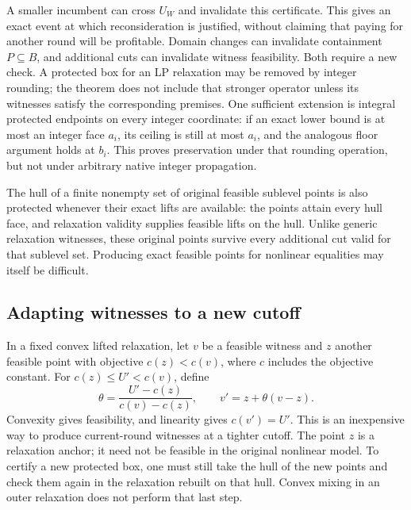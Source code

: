 A smaller incumbent can cross $U_W$ and invalidate this certificate.
This gives an exact event at which reconsideration is justified, without
claiming that paying for another round will be profitable. Domain changes
can invalidate containment $P\subseteq B$, and additional cuts can
invalidate witness feasibility. Both require a new check. A protected
box for an LP relaxation may be removed by integer rounding; the theorem
does not include that stronger operator unless its witnesses satisfy the
corresponding premises.
One sufficient extension is integral protected endpoints on every integer
coordinate: if an exact lower bound is at most an integer face $a_i$,
its ceiling is still at most $a_i$, and the analogous floor argument
holds at $b_i$. This proves preservation under that rounding operation,
but not under arbitrary native integer propagation.

The hull of a finite nonempty set of original feasible sublevel points
is also protected whenever their exact lifts are available: the points
attain every hull face, and relaxation validity supplies feasible lifts
on the hull. Unlike generic relaxation witnesses, these original points
survive every additional cut valid for that sublevel set. Producing exact
feasible points for nonlinear equalities may itself be difficult.

\subsection{Adapting witnesses to a new cutoff}

In a fixed convex lifted relaxation, let $v$ be a feasible witness and
$z$ another feasible point with objective $c(z)<c(v)$, where $c$ includes
the objective constant. For $c(z)\le U'<c(v)$, define
\begin{equation}\label{eq:mixing}
 \theta=\frac{U'-c(z)}{c(v)-c(z)},\qquad
 v'=z+\theta(v-z).
\end{equation}
Convexity gives feasibility, and linearity gives $c(v')=U'$.
This is an inexpensive way to produce current-round witnesses at a
tighter cutoff. The point $z$ is a relaxation anchor; it need not be
feasible in the original nonlinear model. To certify a new protected box,
one must still take the hull of the new points and check them again in
the relaxation rebuilt on that hull. Convex mixing in an outer relaxation
does not perform that last step.

